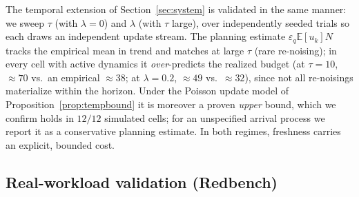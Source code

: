 \documentclass[sigconf,nonacm]{acmart}
\newcommand{\eps}{\varepsilon}
\newcommand{\E}{\mathbb{E}}
\begin{document}
The temporal extension of Section~\ref{sec:system} is validated in the same manner: we sweep $\tau$ (with $\lambda{=}0$) and $\lambda$ (with $\tau$ large), over independently seeded trials so each draws an independent update stream. The planning estimate $\eps_q\E[u_k]N$ tracks the empirical mean in trend and matches at large $\tau$ (rare re-noising); in every cell with active dynamics it \emph{over}-predicts the realized budget (at $\tau{=}10$, ${\approx}70$ vs.\ an empirical ${\approx}38$; at $\lambda{=}0.2$, ${\approx}49$ vs.\ ${\approx}32$), since not all re-noisings materialize within the horizon. Under the Poisson update model of Proposition~\ref{prop:tempbound} it is moreover a proven \emph{upper} bound, which we confirm holds in $12/12$ simulated cells; for an unspecified arrival process we report it as a conservative planning estimate. In both regimes, freshness carries an explicit, bounded cost.

\subsection{Real-workload validation (Redbench)}
\label{sec:redbench}
\end{document}
